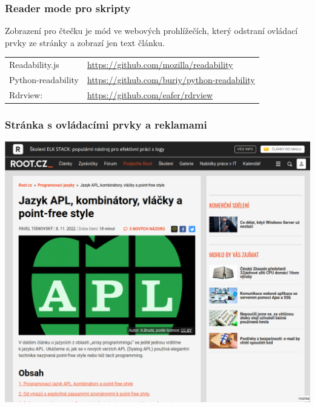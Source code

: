 \begin{frame}
  \frametitle{Reader mode pro skripty}
  Zobrazení pro čtečku je mód ve webových prohlížečích, který odstraní ovládací prvky ze stránky a zobrazí jen text článku.

  \bigskip

  \begin{tabular}{ll}
    Readability.js & \url{https://github.com/mozilla/readability}\\
    Python-readability & \url{https://github.com/buriy/python-readability}\\
    Rdrview: &\url{https://github.com/eafer/rdrview}\\
  \end{tabular}

\end{frame}

\begin{frame}
  \frametitle{Stránka s ovládacími prvky a reklamami}
  \begin{center}
    \includegraphics[height=.9\textheight]{img/root-balast.png}
  \end{center}
\end{frame}

